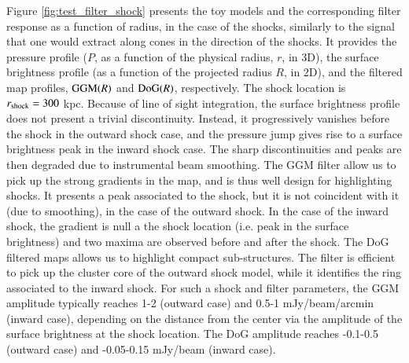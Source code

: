 \documentclass[twocolumn,traditabstract]{aa}
\begin{document}
Figure \ref{fig:test_filter_shock} presents the toy models and the corresponding filter response as a function of radius, in the case of the shocks, similarly to the signal that one would extract along cones in the direction of the shocks. It provides the pressure profile ($P$, as a function of the physical radius, $r$, in 3D), the surface brightness profile (as a function of the projected radius $R$, in 2D), and the filtered map profiles, ${\rm GGM}(R)$ and ${\rm DoG}(R)$, respectively. The shock location is $r_{\rm shock} = 300$ kpc. Because of line of sight integration, the surface brightness profile does not present a trivial discontinuity. Instead, it progressively vanishes before the shock in the outward shock case, and the pressure jump gives rise to a surface brightness peak in the inward shock case. The sharp discontinuities and peaks are then degraded due to instrumental beam smoothing. The GGM filter allow us to pick up the strong gradients in the map, and is thus well design for highlighting shocks. It presents a peak associated to the shock, but it is not coincident with it (due to smoothing), in the case of the outward shock. In the case of the inward shock, the gradient is null a the shock location (i.e. peak in the surface brightness) and two maxima are observed before and after the shock. The DoG filtered maps allows us to highlight compact sub-structures. The filter is efficient to pick up the cluster core of the outward shock model, while it identifies the ring associated to the inward shock. For such a shock and filter parameters, the GGM amplitude typically reaches 1-2 (outward case) and 0.5-1 mJy/beam/arcmin (inward case), depending on the distance from the center via the amplitude of the surface brightness at the shock location. The DoG amplitude reaches -0.1-0.5 (outward case) and -0.05-0.15 mJy/beam (inward case).
\end{document}
